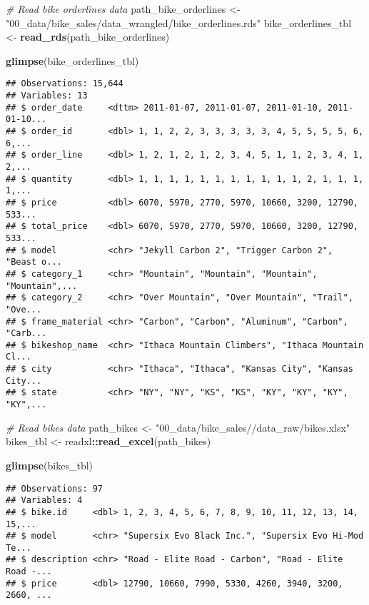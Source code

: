\documentclass[]{article}
\newenvironment{Shaded}{\begin{snugshade}}{\end{snugshade}}
\newcommand{\CommentTok}[1]{\textcolor[rgb]{0.56,0.35,0.01}{\textit{#1}}}
\newcommand{\KeywordTok}[1]{\textcolor[rgb]{0.13,0.29,0.53}{\textbf{#1}}}
\newcommand{\NormalTok}[1]{#1}
\newcommand{\OperatorTok}[1]{\textcolor[rgb]{0.81,0.36,0.00}{\textbf{#1}}}
\newcommand{\StringTok}[1]{\textcolor[rgb]{0.31,0.60,0.02}{#1}}
\begin{document}
\begin{Shaded}
\begin{Highlighting}[]
\CommentTok{# Read bike orderlines data}
\NormalTok{path_bike_orderlines <-}\StringTok{ "00_data/bike_sales/data_wrangled/bike_orderlines.rds"}
\NormalTok{bike_orderlines_tbl <-}\StringTok{ }\KeywordTok{read_rds}\NormalTok{(path_bike_orderlines)}

\KeywordTok{glimpse}\NormalTok{(bike_orderlines_tbl)}
\end{Highlighting}
\end{Shaded}

\begin{verbatim}
## Observations: 15,644
## Variables: 13
## $ order_date     <dttm> 2011-01-07, 2011-01-07, 2011-01-10, 2011-01-10...
## $ order_id       <dbl> 1, 1, 2, 2, 3, 3, 3, 3, 3, 4, 5, 5, 5, 5, 6, 6,...
## $ order_line     <dbl> 1, 2, 1, 2, 1, 2, 3, 4, 5, 1, 1, 2, 3, 4, 1, 2,...
## $ quantity       <dbl> 1, 1, 1, 1, 1, 1, 1, 1, 1, 1, 1, 2, 1, 1, 1, 1,...
## $ price          <dbl> 6070, 5970, 2770, 5970, 10660, 3200, 12790, 533...
## $ total_price    <dbl> 6070, 5970, 2770, 5970, 10660, 3200, 12790, 533...
## $ model          <chr> "Jekyll Carbon 2", "Trigger Carbon 2", "Beast o...
## $ category_1     <chr> "Mountain", "Mountain", "Mountain", "Mountain",...
## $ category_2     <chr> "Over Mountain", "Over Mountain", "Trail", "Ove...
## $ frame_material <chr> "Carbon", "Carbon", "Aluminum", "Carbon", "Carb...
## $ bikeshop_name  <chr> "Ithaca Mountain Climbers", "Ithaca Mountain Cl...
## $ city           <chr> "Ithaca", "Ithaca", "Kansas City", "Kansas City...
## $ state          <chr> "NY", "NY", "KS", "KS", "KY", "KY", "KY", "KY",...
\end{verbatim}

\begin{Shaded}
\begin{Highlighting}[]
\CommentTok{# Read bikes data}
\NormalTok{path_bikes <-}\StringTok{ "00_data/bike_sales//data_raw/bikes.xlsx"}
\NormalTok{bikes_tbl <-}\StringTok{ }\NormalTok{readxl}\OperatorTok{::}\KeywordTok{read_excel}\NormalTok{(path_bikes)}

\KeywordTok{glimpse}\NormalTok{(bikes_tbl)}
\end{Highlighting}
\end{Shaded}

\begin{verbatim}
## Observations: 97
## Variables: 4
## $ bike.id     <dbl> 1, 2, 3, 4, 5, 6, 7, 8, 9, 10, 11, 12, 13, 14, 15,...
## $ model       <chr> "Supersix Evo Black Inc.", "Supersix Evo Hi-Mod Te...
## $ description <chr> "Road - Elite Road - Carbon", "Road - Elite Road -...
## $ price       <dbl> 12790, 10660, 7990, 5330, 4260, 3940, 3200, 2660, ...
\end{verbatim}
\end{document}
